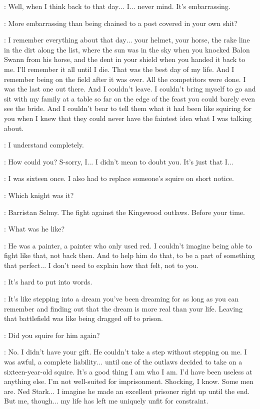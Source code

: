 \ALTON: Well, when I think back to that day$\ldots$ I$\ldots$ never mind. It's embarrassing.

\JAIME: More embarrassing than being chained to a post covered in your own shit?

\ALTON: I remember everything about that day$\ldots$ your helmet, your horse, the rake line in the dirt along the list, where the sun was in the sky when you knocked Balon Swann from his horse, and the dent in your shield when you handed it back to me. I'll remember it all until I die. That was the best day of my life. And I remember being on the field after it was over. All the competitors were done. I was the last one out there. And I couldn't leave. I couldn't bring myself to go and sit with my family at a table so far on the edge of the feast you could barely even see the bride. And I couldn't bear to tell them what it had been like squiring for you when I knew that they could never have the faintest idea what I was talking about.

\JAIME: I understand completely.

\ALTON: How could you? S-sorry, I$\ldots$ I didn't mean to doubt you. It's just that I$\ldots$

\JAIME: I was sixteen once. I also had to replace someone's squire on short notice.

\ALTON: Which knight was it?

\JAIME: Barristan Selmy. The fight against the Kingswood outlaws. Before your time.

\ALTON: What was he like?

\JAIME: He was a painter, a painter who only used red. I couldn't imagine being able to fight like that, not back then. And to help him do that, to be a part of something that perfect$\ldots$ I don't need to explain how that felt, not to you.

\ALTON: It's hard to put into words.

\JAIME: It's like stepping into a dream you've been dreaming for as long as you can remember and finding out that the dream is more real than your life. Leaving that battlefield was like being dragged off to prison.

\ALTON: Did you squire for him again?

\JAIME: No. I didn't have your gift. He couldn't take a step without stepping on me. I was awful, a complete liability$\ldots$ until one of the outlaws decided to take on a sixteen-year-old squire. It's a good thing I am who I am. I'd have been useless at anything else. I'm not well-suited for imprisonment. Shocking, I know. Some men are. Ned Stark$\ldots$ I imagine he made an excellent prisoner right up until the end. But me, though$\ldots$ my life has left me uniquely unfit for constraint.

